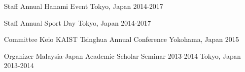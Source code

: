 

\begin{cvhonors}



  \cvhonor
    {Staff} %
    {Annual Hanami Event} %
    {Tokyo, Japan} %
    {2014-2017} %

  \cvhonor
    {Staff} %
    {Annual Sport Day} %
    {Tokyo, Japan} %
    {2014-2017} %

  \cvhonor
    {Committee} %
    {Keio KAIST Tsinghua Annual Conference} %
    {Yokohama, Japan} %
    {2015} %

  \cvhonor
    {Organizer} %
    {Malaysia-Japan Academic Scholar Seminar 2013-2014} %
    {Tokyo, Japan} %
    {2013-2014} %

\end{cvhonors}
